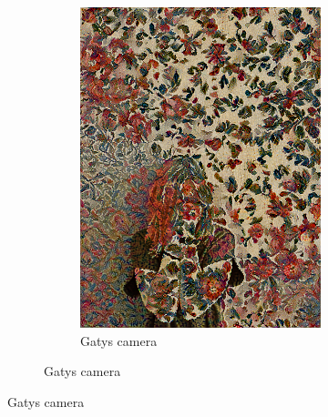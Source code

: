 \begin{figure}[]
\begin{subfigure}{\textwidth}
\begin{subfigure}{0.24\textwidth}
            \includegraphics[width=\textwidth]{images/04-experiment02/human/flowers/gatys_proj.jpg}
            \caption*{Gatys camera}
        \end{subfigure}
        

\end{subfigure}
\end{figure}
